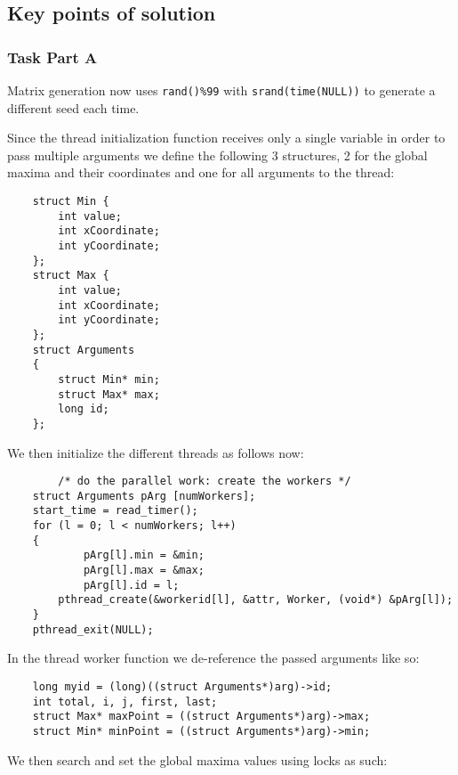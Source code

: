\documentclass[a4paper,11pt]{article}
\begin{document}
\subsection*{Key points of solution}

\subsubsection*{Task Part A}

Matrix generation now uses {\tt rand()\%99} with {\tt srand(time(NULL))} to generate a different seed each time.

Since the thread initialization function receives only a single variable in order to pass multiple arguments we define the following 3 structures, 2 for the global maxima and their coordinates and one for all arguments to the thread:
\begin{verbatim}
    struct Min {
        int value;
        int xCoordinate;
        int yCoordinate;
    };
    struct Max {
        int value;
        int xCoordinate;
        int yCoordinate;
    };
    struct Arguments
    {
        struct Min* min;
        struct Max* max;
        long id;
    };
\end{verbatim}
We then initialize the different threads as follows now:
\begin{verbatim}
        /* do the parallel work: create the workers */
    struct Arguments pArg [numWorkers];
    start_time = read_timer();
    for (l = 0; l < numWorkers; l++)
    {
            pArg[l].min = &min;
            pArg[l].max = &max;
            pArg[l].id = l;
        pthread_create(&workerid[l], &attr, Worker, (void*) &pArg[l]);
    }
    pthread_exit(NULL);
\end{verbatim}

In the thread worker function we de-reference the passed arguments like so:

\begin{verbatim}
    long myid = (long)((struct Arguments*)arg)->id;
    int total, i, j, first, last;
    struct Max* maxPoint = ((struct Arguments*)arg)->max;
    struct Min* minPoint = ((struct Arguments*)arg)->min;
\end{verbatim}

We then search and set the global maxima values using locks as such:
\end{document}
